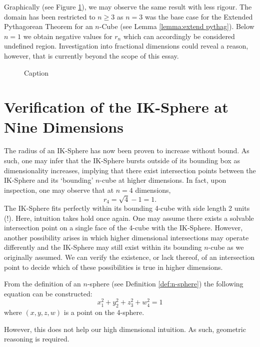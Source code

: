 Graphically (see Figure \ref{fig:radius increases graph}), we may observe the same result with less rigour. The domain has been restricted to $n\geq3$ as $n=3$ was the base case for the Extended Pythagorean Theorem for an $n$-Cube (see Lemma \ref{lemma:extend pythag}). Below $n=1$ we obtain negative values for $r_n$ which can accordingly be considered undefined region. Investigation into fractional dimensions could reveal a reason, however, that is currently beyond the scope of this essay.
\begin{figure}[H]
    \centering
    \caption{Caption}
    \label{fig:radius increases graph}
\end{figure}






\section{Verification of the IK-Sphere at Nine Dimensions}
The radius of an IK-Sphere has now been proven to increase without bound. As such, one may infer that the IK-Sphere bursts outside of its bounding box as dimensionality increases, implying that there exist intersection points between the IK-Sphere and its `bounding' $n$-cube at higher dimensions. In fact, upon inspection, one may observe that at $n=4$ dimensions, $$r_4=\sqrt{4}-1=1.$$ The IK-Sphere fits perfectly within its bounding 4-cube with side length 2 units (!). Here, intuition takes hold once again. One may assume there exists a solvable intersection point on a single face of the 4-cube with the IK-Sphere. However, another possibility arises in which higher dimensional intersections may operate differently and the IK-Sphere may still exist within its bounding $n$-cube as we originally assumed. We can verify the existence, or lack thereof, of an intersection point to decide which of these possibilities is true in higher dimensions.

From the definition of an $n$-sphere (see Definition \ref{def:n-sphere}) the following equation can be constructed:
\begin{equation}\label{eq:unit 4-sphere}
    x_1^2+y_2^2+z_3^2+w_4^2=1
\end{equation}
where $(x, y, z, w)$ is a point on the 4-sphere.

However, this does not help our high dimensional intuition. As such, geometric reasoning is required.

